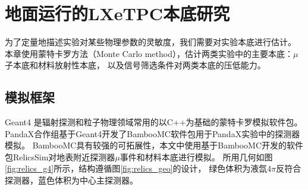 
\chapter{地面运行的LXeTPC本底研究}
\label{sec:backgrounds}

为了定量地描述实验对某些物理参数的灵敏度，我们需要对实验本底进行估计。
本章使用蒙特卡罗方法（Monte Carlo method），估计两类实验中的主要本底：$\mu$子本底和材料放射性本底，
以及信号筛选条件对两类本底的压低能力。

\section{模拟框架}

Geant4 是辐射探测和粒子物理领域常用的以C++为基础的蒙特卡罗模拟软件包\cite{agostinelli_geant4simulation_2003,allison_geant4_2006,allison_recent_2016}。
PandaX合作组基于Geant4开发了BambooMC软件包用于PandaX实验中的探测器模拟\cite{chen_bamboomc_2021}。
BambooMC具有较强的可拓展性，本文中使用基于BambooMC开发的软件包RelicsSim对地表附近探测器$\mu$事件和材料本底进行模拟。
所用几何如图\ref{fig:relics_g4}所示，结构遵循图\ref{fig:relics_geo}的设计，
绿色体积为液氙4$\pi$反符合探测器，蓝色体积为中心主探测器。

